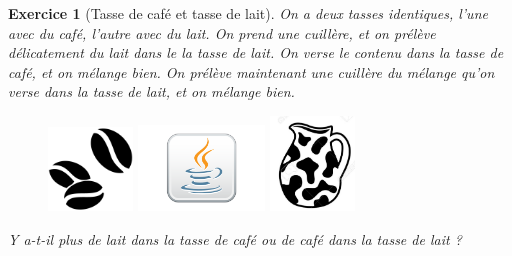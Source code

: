 \documentclass[12pt]{article}
\theoremstyle{break}
\newtheorem{exo}{Exercice}
\begin{document}
\begin{exo}[Tasse de café et tasse de lait]
On a deux tasses identiques, l'une avec du café, l'autre avec du lait. On prend une cuillère, et on prélève délicatement du lait dans le la tasse de lait. On verse le contenu dans la tasse de café, et on mélange bien. On prélève maintenant une cuillère du mélange qu'on verse dans la tasse de lait, et on mélange bien.

\begin{figure}[!ht]
	\centering
	\includegraphics[width=0.2\textwidth]{images/grainCafe.png}
    \includegraphics[width=0.3\textwidth]{images/LogoJava.png}
    \includegraphics[width=0.2\textwidth]{images/potAlait.jpg}
\end{figure}

Y a-t-il plus de lait dans la tasse de café ou de café dans la tasse de lait ?

\end{exo}
\end{document}
